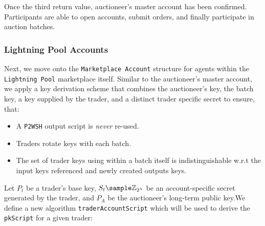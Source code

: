 \documentclass[10pt,a4paper]{article}
\theoremstyle{definition}
\begin{document}
Once the third return value, auctioneer's master account has been confirmed.
Participants are able to open accounts, submit orders, and finally participate
in auction batches.


\subsubsection{Lightning Pool Accounts}

Next, we move onto the \texttt{Marketplace Account} structure for agents within
the \texttt{Lightning Pool} marketplace itself. Similar to the auctioneer's
master account, we apply a key derivation scheme that combines the auctioneer's
key, the batch key, a key supplied by the trader, and a distinct trader
specific secret to ensure, that:
\begin{itemize}
    \item A \texttt{P2WSH} output script is \emph{never} re-used.
    \item Traders rotate keys with each batch.
    \item The set of trader keys using within a batch itself is
        indistinguishable w.r.t the input keys referenced and newly created
        outputs keys.
\end{itemize}

Let $P_{t}$ be a trader's base key, $S_{t} \sample \mathbb{Z}_{2^{\lambda}}$ be an
account-specific secret generated by the trader, and $P_{A}$ be the
auctioneer's long-term public key.We define a new algorithm
\texttt{traderAccountScript} which will be used to derive the \texttt{pkScript}
for a given trader:

\begin{pcvstack}[boxed,center, space=1em]
\end{pcvstack}
\end{document}

